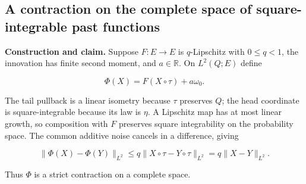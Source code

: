 \documentclass[11pt,a4paper]{report}
\begin{document}
\subsection{\texorpdfstring{A contraction on the complete space of square-integrable past functions}{A contraction on the complete space of square-integrable past functions}}
\label{report-step-WassersteinMixing-Invariant-lean-2}


\textbf{Construction and claim.} Suppose \(F:E\to E\) is \(q\)-Lipschitz with \(0\le q<1\), the innovation has finite second moment, and \(a\in\mathbb R\). On \(L^2(Q;E)\) define

\[\Phi(X)=F(X\circ\tau)+a\omega_0.\]


The tail pullback is a linear isometry because \(\tau\) preserves \(Q\); the head coordinate is square-integrable because its law is \(\eta\). A Lipschitz map has at most linear growth, so composition with \(F\) preserves square integrability on the probability space. The common additive noise cancels in a difference, giving

\[\|\Phi(X)-\Phi(Y)\|_{L^2}\le q\|X\circ\tau-Y\circ\tau\|_{L^2}
=q\|X-Y\|_{L^2}.\]


Thus \(\Phi\) is a strict contraction on a complete space.
\end{document}
